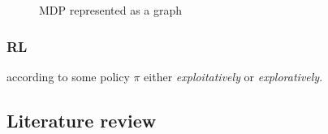 \begin{figure}[!htb]
    \centering
    \caption{MDP represented as a graph}
    \label{fig:mdp-graph-repr}
\end{figure}

\subsubsection{RL}
according to some policy $\pi$ either \textit{exploitatively} or \textit{exploratively}.

\subsection{Literature review}

\cite{AbdulhaiPringleKarakoulas}
\cite{StateRepresentations}
\cite{ExploringRewardDefinitions}
